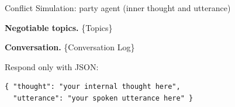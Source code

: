 \documentclass{llmxive}
\begin{document}
\begin{table}[p]
\begin{promptbox}{Conflict Simulation: party agent (inner thought and utterance)}
\begin{userbox}
\smallskip
\textbf{Negotiable topics.} \{Topics\}

\smallskip
\textbf{Conversation.} \{Conversation Log\}

\smallskip
Respond only with JSON:
\begin{verbatim}
{ "thought": "your internal thought here",
  "utterance": "your spoken utterance here" }
\end{verbatim}
\end{userbox}
\end{promptbox}
\vspace{-0.25cm}
\vspace{-0.3cm}
\label{tab:prompt-party}
\caption{Prompt for persona-conditioned party simulation.}
\end{table}
\end{document}
